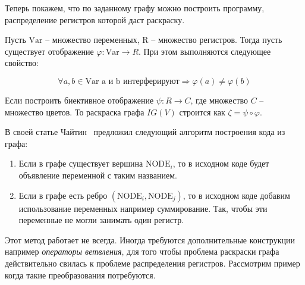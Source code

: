 Теперь покажем, что по заданному графу можно построить программу, распределение регистров которой даст раскраску.

Пусть $\text{Var}$ -- множество переменных, $\text{R}$ -- множество регистров.
Тогда пусть существует отображение $\varphi : \text{Var} \to R$. При этом выполняются следующее свойство:

$$\forall a, b \in \text{Var} \text{ a и b интерферируют}  \Rightarrow \varphi(a) \neq \varphi(b)$$

Если построить биективное отображение $\psi: R \to C$, где множество $C$ -- множество цветов.
То раскраска графа $IG(V)$ строится как $\zeta = \psi \circ \varphi$.


В своей статье Чайтин~\cite{chaitin1982} предложил следующий алгоритм построения кода из графа:

\begin{enumerate}
    \item Если в графе существует вершина $\text{NODE}_i$, то в исходном коде будет объявление переменной с таким
    названием.
    \item Если в графе есть ребро $(\text{NODE}_i, \text{NODE}_j)$, то в исходном коде добавим использование переменных
    например суммирование. Так, чтобы эти переменные не могли занимать один регистр.
\end{enumerate}

Этот метод работает не всегда. Иногда требуются дополнительные конструкции например \textit{операторы ветвления},
для того чтобы проблема раскраски графа действительно свилась к проблеме распределения регистров. Рассмотрим пример когда такие
преобразования потребуются.

